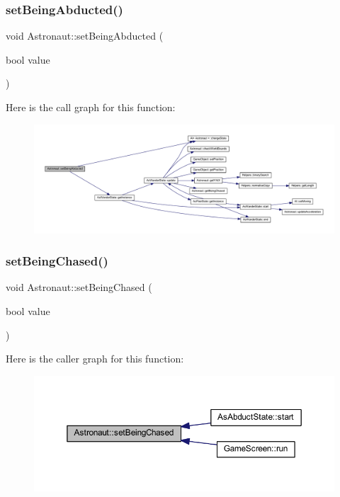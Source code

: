 \subsubsection{\texorpdfstring{set\+Being\+Abducted()}{setBeingAbducted()}}
{\footnotesize\ttfamily void Astronaut\+::set\+Being\+Abducted (\begin{DoxyParamCaption}\item[{bool}]{value }\end{DoxyParamCaption})}

Here is the call graph for this function\+:
\nopagebreak
\begin{figure}[H]
\begin{center}
\leavevmode
\includegraphics[width=350pt]{class_astronaut_a8ca3c9ed488fe685374247cc7e234d81_cgraph}
\end{center}
\end{figure}
\mbox{\label{class_astronaut_aab8db8ea9ed7d4bf0c594a911f276ce5}} 
\subsubsection{\texorpdfstring{set\+Being\+Chased()}{setBeingChased()}}
{\footnotesize\ttfamily void Astronaut\+::set\+Being\+Chased (\begin{DoxyParamCaption}\item[{bool}]{value }\end{DoxyParamCaption})}

Here is the caller graph for this function\+:
\nopagebreak
\begin{figure}[H]
\begin{center}
\leavevmode
\includegraphics[width=350pt]{class_astronaut_aab8db8ea9ed7d4bf0c594a911f276ce5_icgraph}
\end{center}
\end{figure}
\mbox{\label{class_astronaut_ab299cd77fd739b597a9d0f97dce79fe5}} 
